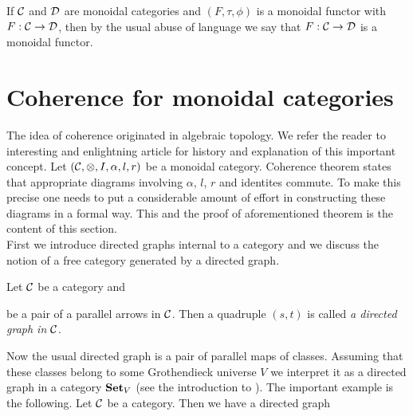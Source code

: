 \noindent
If ${\mathcal C}$ and ${\mathcal D}$ are monoidal categories and $(F,\tau,\phi)$ is a monoidal functor with $F:{\mathcal C}\rightarrow {\mathcal D}$, then by the usual abuse of language we say that $F:{\mathcal C}\rightarrow {\mathcal D}$ is a monoidal functor.


\section{Coherence for monoidal categories}
\noindent
The idea of coherence originated in algebraic topology. We refer the reader to interesting and enlightning article \cite{maclane1963natural} for history and explanation of this important concept. Let $({\mathcal C},\otimes, I,\alpha, l, r)$ be a monoidal category. Coherence theorem states that appropriate diagrams involving $\alpha$, $l$, $r$ and identites commute. To make this precise one needs to put a considerable amount of effort in constructing these diagrams in a formal way. This and the proof of aforementioned theorem is the content of this section.\\   
First we introduce directed graphs internal to a category and we discuss the notion of a free category generated by a directed graph.
\begin{definition}
Let ${\mathcal C}$ be a category and 
\begin{center}
\end{center}
be a pair of a parallel arrows in ${\mathcal C}$. Then a quadruple $(s,t)$ is called \textit{a directed graph in ${\mathcal C}$}.
\end{definition}
\noindent
Now the usual directed graph is a pair of parallel maps of classes. Assuming that these classes belong to some Grothendieck universe $V$ we interpret it as a directed graph in a category $\mathbf{Set}_V$ (see the introduction to \cite{Presheaves}). The important example is the following. Let ${\mathcal C}$ be a category. Then we have a directed graph
\begin{center}
\end{center}

